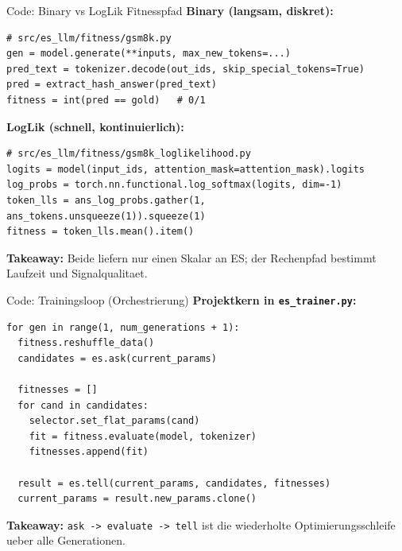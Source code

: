 \documentclass[aspectratio=169,11pt]{beamer}
\begin{document}
\begin{frame}[fragile]{Code: Binary vs LogLik Fitnesspfad}
\textbf{Binary (langsam, diskret):}
\begin{lstlisting}[style=pycode]
# src/es_llm/fitness/gsm8k.py
gen = model.generate(**inputs, max_new_tokens=...)
pred_text = tokenizer.decode(out_ids, skip_special_tokens=True)
pred = extract_hash_answer(pred_text)
fitness = int(pred == gold)   # 0/1
\end{lstlisting}

\textbf{LogLik (schnell, kontinuierlich):}
\begin{lstlisting}[style=pycode]
# src/es_llm/fitness/gsm8k_loglikelihood.py
logits = model(input_ids, attention_mask=attention_mask).logits
log_probs = torch.nn.functional.log_softmax(logits, dim=-1)
token_lls = ans_log_probs.gather(1, ans_tokens.unsqueeze(1)).squeeze(1)
fitness = token_lls.mean().item()
\end{lstlisting}

\textbf{Takeaway:} Beide liefern nur einen Skalar an ES; der Rechenpfad bestimmt Laufzeit und Signalqualitaet.
\end{frame}

\begin{frame}[fragile]{Code: Trainingsloop (Orchestrierung)}
\textbf{Projektkern in \texttt{es\_trainer.py}:}

\begin{lstlisting}[style=pycode]
for gen in range(1, num_generations + 1):
  fitness.reshuffle_data()
  candidates = es.ask(current_params)

  fitnesses = []
  for cand in candidates:
    selector.set_flat_params(cand)
    fit = fitness.evaluate(model, tokenizer)
    fitnesses.append(fit)

  result = es.tell(current_params, candidates, fitnesses)
  current_params = result.new_params.clone()
\end{lstlisting}

\textbf{Takeaway:} \texttt{ask -> evaluate -> tell} ist die wiederholte Optimierungsschleife ueber alle Generationen.
\end{frame}
\end{document}
